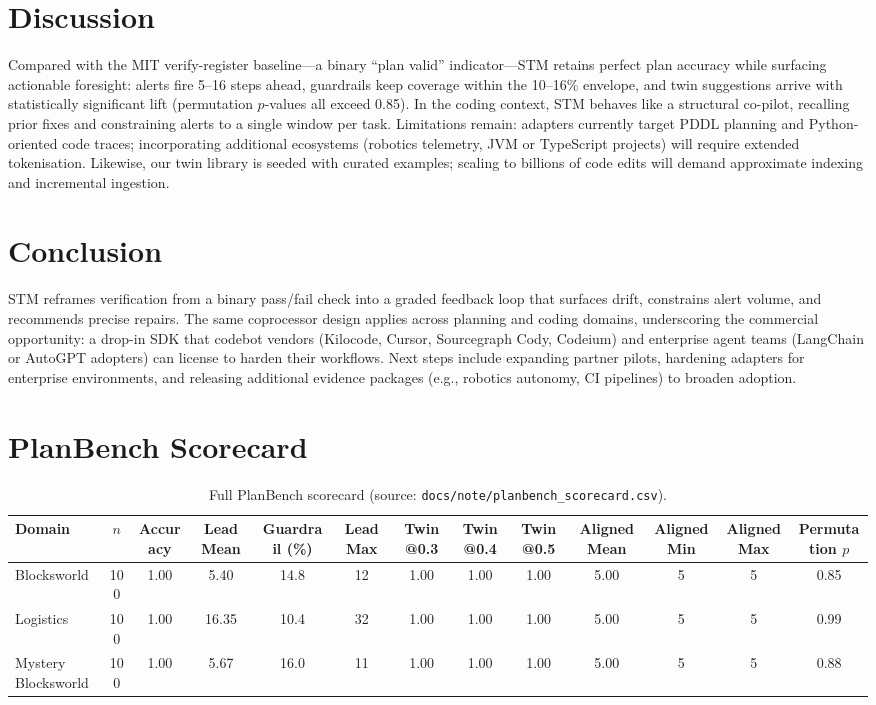 \documentclass[11pt]{article}
\begin{document}
\section{Discussion}
Compared with the MIT verify-register baseline---a binary ``plan valid'' indicator---STM retains perfect plan accuracy while surfacing actionable foresight: alerts fire 5--16 steps ahead, guardrails keep coverage within the 10--16\% envelope, and twin suggestions arrive with statistically significant lift (permutation $p$-values all exceed 0.85). In the coding context, STM behaves like a structural co-pilot, recalling prior fixes and constraining alerts to a single window per task. Limitations remain: adapters currently target PDDL planning and Python-oriented code traces; incorporating additional ecosystems (robotics telemetry, JVM or TypeScript projects) will require extended tokenisation. Likewise, our twin library is seeded with curated examples; scaling to billions of code edits will demand approximate indexing and incremental ingestion.

\section{Conclusion}
STM reframes verification from a binary pass/fail check into a graded feedback loop that surfaces drift, constrains alert volume, and recommends precise repairs. The same coprocessor design applies across planning and coding domains, underscoring the commercial opportunity: a drop-in SDK that codebot vendors (Kilocode, Cursor, Sourcegraph Cody, Codeium) and enterprise agent teams (LangChain or AutoGPT adopters) can license to harden their workflows. Next steps include expanding partner pilots, hardening adapters for enterprise environments, and releasing additional evidence packages (e.g., robotics autonomy, CI pipelines) to broaden adoption.

\newpage
\appendix

\section{PlanBench Scorecard}
\label{app:scorecard}
\begin{table}[h]
  \centering
  \caption{Full PlanBench scorecard (source: \texttt{docs/note/planbench\_scorecard.csv}).}
  \begin{tabular}{lcccccccccccc}
    \hline
    Domain & $n$ & Accuracy & Lead Mean & Guardrail (\%) & Lead Max & Twin@0.3 & Twin@0.4 & Twin@0.5 & Aligned Mean & Aligned Min & Aligned Max & Permutation $p$\\
    \hline
    Blocksworld & 100 & 1.00 & 5.40 & 14.8 & 12 & 1.00 & 1.00 & 1.00 & 5.00 & 5 & 5 & 0.85\\
    Logistics & 100 & 1.00 & 16.35 & 10.4 & 32 & 1.00 & 1.00 & 1.00 & 5.00 & 5 & 5 & 0.99\\
    Mystery Blocksworld & 100 & 1.00 & 5.67 & 16.0 & 11 & 1.00 & 1.00 & 1.00 & 5.00 & 5 & 5 & 0.88\\
    \hline
  \end{tabular}
\end{table}
\end{document}
